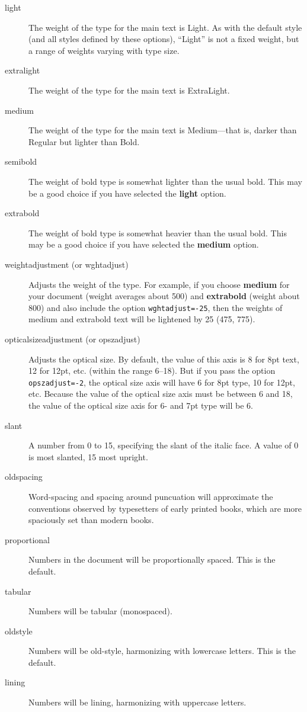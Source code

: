 \documentclass[12pt]{article}
\begin{document}
\begin{description}
    \item[light] The weight of the type for the main text is Light. As with the default
    style (and all styles defined by these options), “Light” is not a fixed weight, but
    a range of weights varying with type size.
    \item[extralight] The weight of the type for the main text is ExtraLight.
    \item[medium] The weight of the type for the main text is Medium---that is, darker than
    Regular but lighter than Bold.
    \item[semibold] The weight of bold type is somewhat lighter than the usual bold. This may be a
    good choice if you have selected the \textbf{light} option.
    \item[extrabold] The weight of bold type is somewhat heavier than the usual bold. This may be a
    good choice if you have selected the \textbf{medium} option.
    \item[weightadjustment (or wghtadjust)] Adjusts the weight of the type. For example, if you choose \textbf{medium}
    for your document (weight averages about 500) and \textbf{extrabold} (weight about 800)
    and also include the option {\color{BrickRed}\verb|wghtadjust=-25|}, then the weights of medium and extrabold
    text will be lightened by 25 (475, 775).
    \item[opticalsizeadjustment (or opszadjust)] Adjusts the optical size. By default, the value of this axis
    is 8 for 8pt text, 12 for 12pt, etc. (within the range 6–18). But if you pass the
    option {\color{BrickRed}\verb|opszadjust=-2|}, the optical size axis will have 6 for 8pt type, 10 for
    12pt, etc. Because the value of the optical size axis must be between 6 and 18, the
    value of the optical size axis for 6- and 7pt type will be 6.
    \item[slant] A number from 0 to 15, specifying the slant of the italic face.
    A value of 0 is {\mostslanted most slanted}, 15 {\leastslanted most upright}.
    \item[oldspacing] Word-spacing and spacing around puncuation will approximate the conventions
    observed by typesetters of early printed books, which are more spaciously set than
    modern books.
    \item[proportional] Numbers in the document will be proportionally spaced. This is the default.
    \item[tabular] Numbers will be tabular (monospaced).
    \item[oldstyle] Numbers will be old-style, harmonizing with lowercase letters. This is the default.
    \item[lining] Numbers will be lining, harmonizing with uppercase letters.
\end{description}
\end{document}
